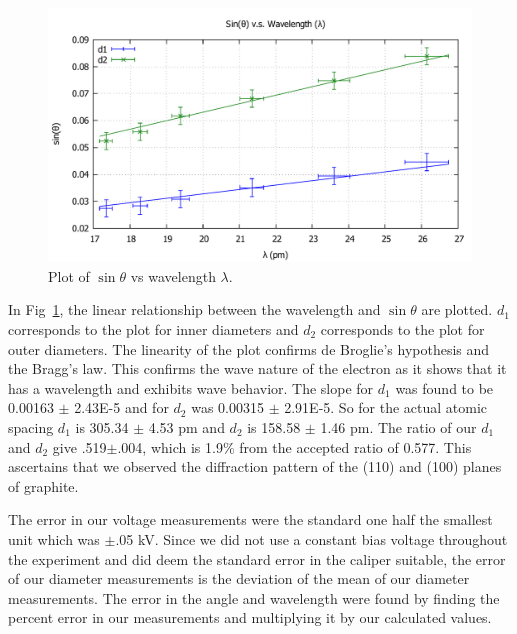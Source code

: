 \documentclass[11pt,letterpaper,onecolumn]{article}
\begin{document}
\begin{figure}[H]
 \begin{center}
 \includegraphics*[scale = .6]{PlotED.pdf}
 \caption{ Plot of $\sin{\theta}$ vs wavelength $\lambda$.~\label{fig:results} }
 \end{center}
\end{figure}

In Fig~\ref{fig:results}, the linear relationship between the wavelength and $\sin{\theta}$ are plotted. $d_1$ corresponds to the plot for inner diameters and $d_2$ corresponds to the plot for outer diameters. The linearity of the plot confirms de Broglie's hypothesis and the Bragg's law. This confirms the wave nature of the electron as it shows that it has a wavelength and exhibits wave behavior. The slope for $d_1$ was found to be 0.00163 $\pm$ 2.43E-5 and for $d_2$ was 0.00315 $\pm$ 2.91E-5. So for the actual atomic spacing $d_1$ is  305.34 $\pm$ 4.53 pm and $d_2$ is 158.58 $\pm$ 1.46 pm. The ratio of our $d_1$ and $d_2$ give .519$\pm$.004, which is 1.9$\%$ from the accepted ratio of 0.577. This ascertains that we observed the diffraction pattern of the (110) and (100) planes of graphite.

The error in our voltage measurements were the standard one half the smallest unit which was $\pm$.05 kV. Since we did not use a constant bias voltage throughout the experiment and did deem the standard error in the caliper suitable, the error of our diameter measurements is the deviation of the mean of our diameter measurements. The error in the angle and wavelength were found by finding the percent error in our measurements and multiplying it by our calculated values.
\end{document}
